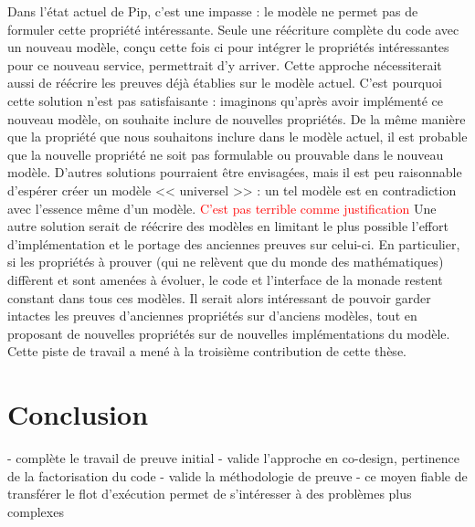 		Dans l'état actuel de Pip, c'est une impasse : le modèle ne permet pas de formuler cette propriété intéressante. Seule une réécriture complète du code avec un nouveau modèle, conçu cette fois ci pour intégrer le propriétés intéressantes pour ce nouveau service, permettrait d'y arriver. Cette approche nécessiterait aussi de réécrire les preuves déjà établies sur le modèle actuel.
		C'est pourquoi cette solution n'est pas satisfaisante : imaginons qu'après avoir implémenté ce nouveau modèle, on souhaite inclure de nouvelles propriétés. De la même manière que la propriété que nous souhaitons inclure dans le modèle actuel, il est probable que la nouvelle propriété ne soit pas formulable ou prouvable dans le nouveau modèle. D'autres solutions pourraient être envisagées, mais il est peu raisonnable d'espérer créer un modèle << universel >> : un tel modèle est en contradiction avec l'essence même d'un modèle. \textcolor{red}{C'est pas terrible comme justification}
		Une autre solution serait de réécrire des modèles en limitant le plus possible l'effort d'implémentation et le portage des anciennes preuves sur celui-ci. En particulier, si les propriétés à prouver (qui ne relèvent que du monde des mathématiques) diffèrent et sont amenées à évoluer, le code et l'interface de la monade restent constant dans tous ces modèles. Il serait alors intéressant de pouvoir garder intactes les preuves d'anciennes propriétés sur d'anciens modèles, tout en proposant de nouvelles propriétés sur de nouvelles implémentations du modèle. Cette piste de travail a mené à la troisième contribution de cette thèse. 

	\section{Conclusion}
	- complète le travail de preuve initial
	- valide l'approche en co-design, pertinence de la factorisation du code
	- valide la méthodologie de preuve
	- ce moyen fiable de transférer le flot d'exécution permet de s'intéresser à des problèmes plus complexes
